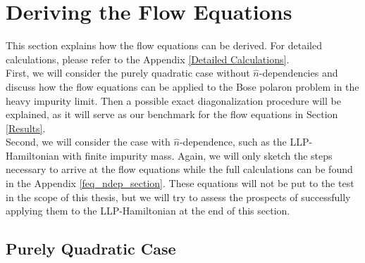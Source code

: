 \chapter{Deriving the Flow Equations}\label{Determining the Flow Equations}
This section explains how the flow equations can be derived. For detailed calculations, please refer to the Appendix \ref{Detailed Calculations}.\\
First, we will consider the purely quadratic case without $\hat n$-dependencies and discuss how the flow equations can be applied to the Bose polaron problem in the heavy impurity limit. Then a possible exact diagonalization procedure will be explained, as it will serve as our benchmark for the flow equations in Section \ref{Results}.\\
Second, we will consider the case with $\hat n$-dependence, such as the LLP-Hamiltonian with finite impurity mass. Again, we will only sketch the steps necessary to arrive at the flow equations while the full calculations can be found in the Appendix \ref{feq_ndep_section}. These equations will not be put to the test in the scope of this thesis, but we will try to assess the prospects of successfully applying them to the LLP-Hamiltonian at the end of this section.
\section{Purely Quadratic Case}
